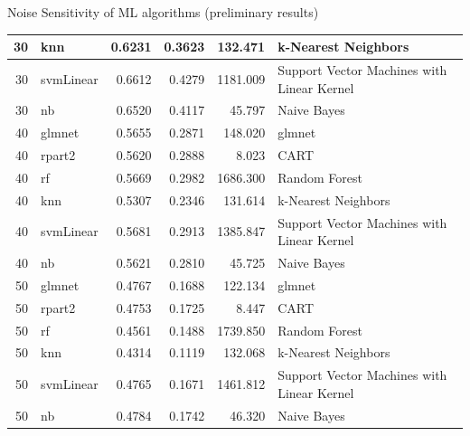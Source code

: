 \documentclass{beamer}\usepackage[]{graphicx}\usepackage[]{color}
\newenvironment{knitrout}{}{} %
\begin{document}
\begin{frame}[fragile]{Noise Sensitivity of ML algorithms (preliminary results)}
\begin{knitrout}
\begin{tabular}{r|l|r|r|r|l}
\hline
30 & knn & 0.6231 & 0.3623 & 132.471 & k-Nearest Neighbors\\
\hline
30 & svmLinear & 0.6612 & 0.4279 & 1181.009 & Support Vector Machines with Linear Kernel\\
\hline
30 & nb & 0.6520 & 0.4117 & 45.797 & Naive Bayes\\
\hline
40 & glmnet & 0.5655 & 0.2871 & 148.020 & glmnet\\
\hline
40 & rpart2 & 0.5620 & 0.2888 & 8.023 & CART\\
\hline
40 & rf & 0.5669 & 0.2982 & 1686.300 & Random Forest\\
\hline
40 & knn & 0.5307 & 0.2346 & 131.614 & k-Nearest Neighbors\\
\hline
40 & svmLinear & 0.5681 & 0.2913 & 1385.847 & Support Vector Machines with Linear Kernel\\
\hline
40 & nb & 0.5621 & 0.2810 & 45.725 & Naive Bayes\\
\hline
50 & glmnet & 0.4767 & 0.1688 & 122.134 & glmnet\\
\hline
50 & rpart2 & 0.4753 & 0.1725 & 8.447 & CART\\
\hline
50 & rf & 0.4561 & 0.1488 & 1739.850 & Random Forest\\
\hline
50 & knn & 0.4314 & 0.1119 & 132.068 & k-Nearest Neighbors\\
\hline
50 & svmLinear & 0.4765 & 0.1671 & 1461.812 & Support Vector Machines with Linear Kernel\\
\hline
50 & nb & 0.4784 & 0.1742 & 46.320 & Naive Bayes\\
\hline
\end{tabular}


\end{knitrout}

\end{frame}
\end{document}
